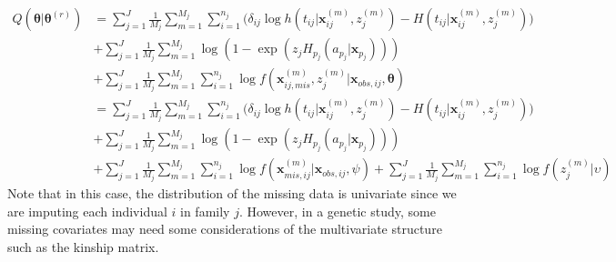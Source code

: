 \documentclass[preprint,12pt]{elsarticle}
\begin{document}
\begin{align} 
    Q(\boldsymbol{\theta}|\boldsymbol{\theta}^{(r)})&=\sum_{j=1}^J \frac{1}{M_j}\sum_{m=1}^{M_j}\sum_{i=1}^{n_j} \Big ( \delta_{ij}\log h(t_{ij}|\mathbf{x}_{ij}^{(m)}, z_j^{(m)}) - H(t_{ij}|\mathbf{x}_{ij}^{(m)}, z_j^{(m)})\Big )\\
    &+\sum_{j=1}^J\frac{1}{M_j}\sum_{m=1}^{M_j}\log(1- \exp(z_j H_{p_j}(a_{p_j}|\mathbf{x}_{p_j})))\\
    &+\sum_{j=1}^J\frac{1}{M_j}\sum_{m=1}^{M_j}\sum_{i=1}^{n_j}\log f(\mathbf{x}_{ij,mis}^{(m)}, z_j^{(m)}|\mathbf{x}_{obs,ij}, \boldsymbol{\theta})\\
    &=\sum_{j=1}^J \frac{1}{M_j}\sum_{m=1}^{M_j}\sum_{i=1}^{n_j} \Big ( \delta_{ij}\log h(t_{ij}|\mathbf{x}_{ij}^{(m)}, z_j^{(m)}) - H(t_{ij}|\mathbf{x}_{ij}^{(m)}, z_j^{(m)})\Big )\\
    &+\sum_{j=1}^J\frac{1}{M_j}\sum_{m=1}^{M_j}\log(1- \exp(z_j H_{p_j}(a_{p_j}|\mathbf{x}_{p_j})))\\
    &+\sum_{j=1}^J\frac{1}{M_j}\sum_{m=1}^{M_j}\sum_{i=1}^{n_j}\log f(\mathbf{x}_{mis,ij}^{(m)}|\mathbf{x}_{obs,ij}, \psi)+\sum_{j=1}^J\frac{1}{M_j}\sum_{m=1}^{M_j}\sum_{i=1}^{n_j}\log f(z_j^{(m)}|\upsilon)
\end{align} 
Note that in this case, the distribution of the missing data is univariate since we are imputing each individual $i$ in family $j$. 
However, in a genetic study, some missing covariates may need some considerations of the multivariate structure such as the kinship matrix. 
\end{document}
